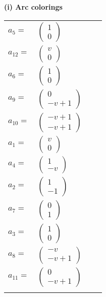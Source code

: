 \documentclass[1p]{elsarticle_modified}
\theoremstyle{definition}
\begin{document}
\flushleft \textbf{(i) Arc colorings}\\
\begin{tabular}{m{7pt} m{180pt} m{7pt} m{180pt} }
\flushright $a_{5}=$&$\begin{pmatrix}1\\0\end{pmatrix}$ \\
\flushright $a_{12}=$&$\begin{pmatrix}v\\0\end{pmatrix}$ \\
\flushright $a_{6}=$&$\begin{pmatrix}1\\0\end{pmatrix}$ \\
\flushright $a_{9}=$&$\begin{pmatrix}0\\- v+1\end{pmatrix}$ \\
\flushright $a_{10}=$&$\begin{pmatrix}- v+1\\- v+1\end{pmatrix}$ \\
\flushright $a_{1}=$&$\begin{pmatrix}v\\0\end{pmatrix}$ \\
\flushright $a_{4}=$&$\begin{pmatrix}1\\- v\end{pmatrix}$ \\
\flushright $a_{2}=$&$\begin{pmatrix}1\\-1\end{pmatrix}$ \\
\flushright $a_{7}=$&$\begin{pmatrix}0\\1\end{pmatrix}$ \\
\flushright $a_{3}=$&$\begin{pmatrix}1\\0\end{pmatrix}$ \\
\flushright $a_{8}=$&$\begin{pmatrix}- v\\- v+1\end{pmatrix}$ \\
\flushright $a_{11}=$&$\begin{pmatrix}0\\- v+1\end{pmatrix}$\\&\end{tabular}
\end{document}
